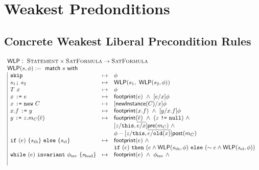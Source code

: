 \section{Weakest Predonditions}

\subsection{Concrete Weakest Liberal Precondition Rules}

\newcommand{\WLP}{\tsf{WLP}}
\newcommand{\weakest}{\max\limits_{\implies}}

\begin{spacing}{1.5}
\begin{align*}
\begin{array}{l}
\WLP : \ \tsc{Statement} \times \tsc{SatFormula} \rightarrow \tsc{SatFormula} \\
\WLP(s, \phi) := \ \tsf{match} \ s \ \tsf{with} \\
\begin{array}{|lcl}
%
\code{skip} &\mapsto&
  \phi
\\
s_1 \code{;} \ s_2 &\mapsto&
  \WLP(s_1, \ \WLP(s_2, \phi))
\\
T \ x &\mapsto&
  \phi
\\
x \ \code{:=} \ e &\mapsto&
  \tsf{footprint}(e) \ \land \
  [ e / x ] \phi
\\
x \ \code{:=} \ \code{new} \ C &\mapsto&
  [ \tsf{newInstance}(C) / x ] \phi
\\
x.f \ \code{:=} \ y &\mapsto&
  \tsf{footprint}(x.f) \ \land \
  [ y / x.f ] \phi
\\
y \ \code{:=} \ z.m_C(\overline{e}) &\mapsto&
  \tsf{footprint}(\overline{e}) \ \land \
  (z \ \code{!=} \ \code{null}) \ \land \\ &&
  [ z/\code{this}, \overline{e/x} ] \tsf{pre}(m_C) \ \land \\ &&
  \phi - [ z/\code{this}, \overline{e/\code{old}(x)} ] \tsf{post}(m_C)
\\
\code{if} \ (e) \ \{ s_\text{th} \} \ \code{else} \ \{ s_\text{el} \} &\mapsto&
  \tsf{footprint}(e) \ \land \\ &&
  \code{if} \ (e) \
  \code{then} \ (e \land \WLP(s_\text{th}, \phi) \
  \code{else} \ (\pnot e \land \WLP(s_\text{el}, \phi))
\\
\code{while} \ (e) \ \code{invariant} \ \phi_\text{inv} \ \{ s_\text{bod} \} &\mapsto&
  \tsf{footprint}(e) \ \land \
  \phi_\text{inv} \ \land \\ &&

\end{array}
\end{array}
\end{align*}
\end{spacing}
